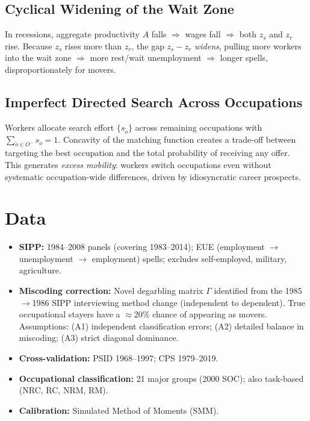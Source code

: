 \subsection*{Cyclical Widening of the Wait Zone}

In recessions, aggregate productivity $A$ falls $\Rightarrow$ wages fall
$\Rightarrow$ both $z_s$ and $z_r$ rise. Because $z_s$ rises more than $z_r$,
the gap $z_s - z_r$ \emph{widens}, pulling more workers into the wait zone
$\Rightarrow$ more rest/wait unemployment $\Rightarrow$ longer spells,
disproportionately for movers.

\subsection*{Imperfect Directed Search Across Occupations}

Workers allocate search effort $\{s_{\tilde{o}}\}$ across remaining
occupations with $\sum_{\tilde{o}\in O^-}s_{\tilde{o}}=1$. Concavity of the
matching function creates a trade-off between targeting the best occupation
and the total probability of receiving any offer. This generates
\emph{excess mobility}: workers switch occupations even without systematic
occupation-wide differences, driven by idiosyncratic career prospects.

\section{Data}

\begin{itemize}
  \item \textbf{SIPP:} 1984--2008 panels (covering 1983--2014); EUE
    (employment $\to$ unemployment $\to$ employment) spells; excludes
    self-employed, military, agriculture.
  \item \textbf{Miscoding correction:} Novel degarbling matrix $\Gamma$
    identified from the 1985$\to$1986 SIPP interviewing method change
    (independent to dependent). True occupational stayers have a
    $\approx$20\% chance of appearing as movers. Assumptions: (A1) independent
    classification errors; (A2) detailed balance in miscoding; (A3) strict
    diagonal dominance.
  \item \textbf{Cross-validation:} PSID 1968--1997; CPS 1979--2019.
  \item \textbf{Occupational classification:} 21 major groups (2000 SOC);
    also task-based (NRC, RC, NRM, RM).
  \item \textbf{Calibration:} Simulated Method of Moments (SMM).
\end{itemize}

